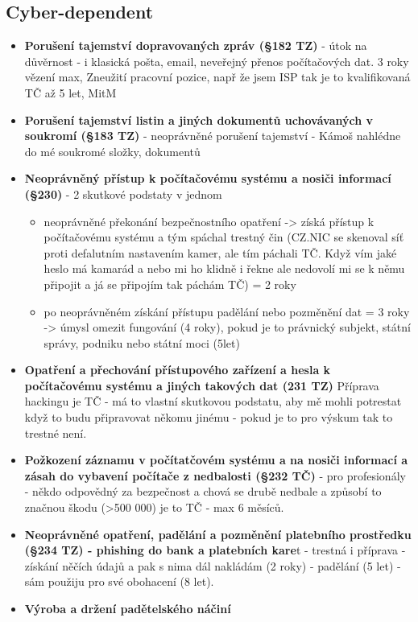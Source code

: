 \subsection{Cyber-dependent}
\begin{itemize}
    \item \textbf{Porušení tajemství dopravovaných zpráv (§182 TZ)} - útok na důvěrnost - i klasická pošta, email, neveřejný přenos počítačových dat. 3 roky vězení max, Zneužití pracovní pozice, např že jsem ISP tak je to kvalifikovaná TČ až 5 let, MitM
    \item \textbf{Porušení tajemství listin a jiných dokumentů uchovávaných v soukromí (§183 TZ)} - neoprávněné porušení tajemství - Kámoš nahlédne do mé soukromé složky, dokumentů
    \item \textbf{Neoprávněný přístup k počítačovému systému a nosiči informací (§230)} - 2 skutkové podstaty v jednom
    \begin{itemize}
        \item neoprávněné překonání bezpečnostního opatření -> získá přístup k počítačovému systému a tým spáchal trestný čin (CZ.NIC se skenoval síť proti defalutním nastavením kamer, ale tím páchali TČ. Když vím jaké heslo má kamarád a nebo mi ho klidně i řekne ale nedovolí mi se k němu připojit a já se připojím tak páchám TČ) = 2 roky
        \item po neoprávněném získání přístupu padělání nebo pozměnění dat = 3 roky -> úmysl omezit fungování (4 roky), pokud je to právnický subjekt, státní správy, podniku nebo státní moci (5let)
    \end{itemize}
    \item \textbf{Opatření a přechování přístupového zařízení a hesla k počítačovému systému a jiných takových dat (231 TZ)} Příprava hackingu je TČ - má to vlastní skutkovou podstatu, aby mě mohli potrestat když to budu připravovat někomu jinému - pokud je to pro výskum tak to trestné není.
    \item \textbf{Požkození záznamu v počítatčovém systému a na nosiči informací a zásah do vybavení počítače z nedbalosti (§232 TČ)} - pro profesionály - někdo odpovědný za bezpečnost a chová se drubě nedbale a způsobí to značnou škodu (>500 000) je to TČ - max 6 měsíců.
    \item \textbf{Neoprávněné opatření, padělání a pozměnění platebního prostředku (§234 TZ) - phishing do bank a platebních kare}t - trestná i příprava - získání něčích údajů a pak s nima dál nakládám (2 roky) - padělání (5 let) - sám použiju pro své obohacení (8 let).
    \item \textbf{Výroba a držení padětelského náčiní}
\end{itemize}

